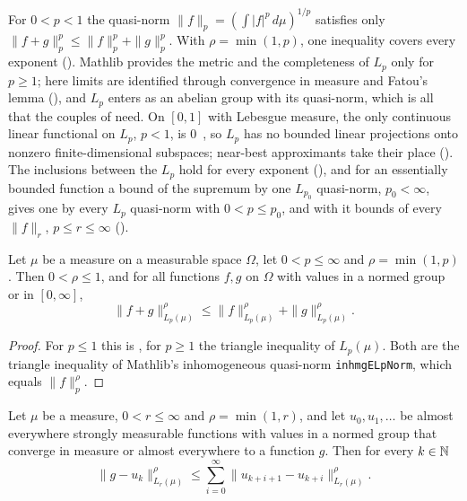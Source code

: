 For $0 < p < 1$ the quasi-norm $\|f\|_p = (\int |f|^p \, d\mu)^{1/p}$ satisfies only
$\|f + g\|_p^p \leq \|f\|_p^p + \|g\|_p^p$. With $\rho = \min(1, p)$, one inequality covers
every exponent (). Mathlib provides the metric and the completeness
of $L_p$ only for $p \geq 1$; here limits are identified through convergence in measure and
Fatou's lemma (),
and $L_p$ enters as an abelian group with its quasi-norm, which is all that the couples of
 need. On $[0, 1]$ with Lebesgue measure, the only continuous linear
functional on $L_p$, $p < 1$, is $0$~\cite{Day1940}, so $L_p$ has no bounded linear projections
onto nonzero finite-dimensional subspaces; near-best approximants take their place
(). The inclusions between the $L_p$ hold for every exponent
(), and for an essentially bounded function a bound of the supremum by
one $L_{p_0}$ quasi-norm, $p_0 < \infty$, gives one by every $L_p$ quasi-norm with
$0 < p \leq p_0$, and with it bounds of every $\|f\|_r$, $p \leq r \leq \infty$
().

\begin{lemma}
\label{lem:lp-quasi-triangle}
\leanok
Let $\mu$ be a measure on a measurable space $\Omega$, let $0 < p \leq \infty$ and
$\rho = \min(1, p)$. Then $0 < \rho \leq 1$, and for all functions $f, g$ on $\Omega$ with values
in a normed group or in $[0, \infty]$,
\[
  \|f + g\|_{L_p(\mu)}^\rho \leq \|f\|_{L_p(\mu)}^\rho + \|g\|_{L_p(\mu)}^\rho .
\]
\end{lemma}

\begin{proof}
\leanok
{}
For $p \leq 1$ this is , for $p \geq 1$ the triangle inequality of
$L_p(\mu)$. Both are the triangle inequality of Mathlib's inhomogeneous quasi-norm
\texttt{inhmgELpNorm}, which equals $\|f\|_p^\rho$.
\end{proof}

\begin{lemma}
\label{lem:limit-telescoping}
\leanok
Let $\mu$ be a measure, $0 < r \leq \infty$ and $\rho = \min(1, r)$, and let $u_0, u_1, \dots$
be almost everywhere strongly measurable functions with values in a normed group that converge
in measure or almost everywhere to a function $g$. Then for every $k \in \mathbb{N}$
\[
  \|g - u_k\|_{L_r(\mu)}^\rho \leq \sum_{i=0}^\infty \|u_{k+i+1} - u_{k+i}\|_{L_r(\mu)}^\rho .
\]
\end{lemma}

